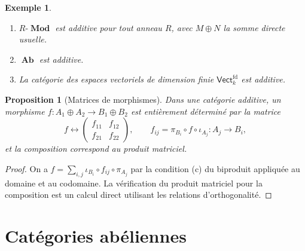 \documentclass[a4paper,12pt]{book}
\DeclareMathOperator{\Ab}{\mathbf{Ab}}
\DeclareMathOperator{\Mod}{\mathbf{Mod}}
\newtheorem{proposition}[theoreme]{Proposition}
\newtheorem{exemple}[theoreme]{Exemple}
\begin{document}
\begin{exemple}\label{ex:additive-cats}
\begin{enumerate}[label=(\roman*)]
\item $R\text{-}\Mod$ est additive pour tout anneau $R$, avec
  $M \oplus N$ la somme directe usuelle.
\item $\Ab$ est additive.
\item La catégorie des espaces vectoriels de dimension finie
  $\mathsf{Vect}_k^{\mathrm{fd}}$
  est additive.
\end{enumerate}
\end{exemple}

\begin{proposition}[Matrices de morphismes]\label{prop:matrix-morphisms}
Dans une catégorie additive, un morphisme
$f \colon A_1 \oplus A_2 \to B_1 \oplus B_2$ est entièrement déterminé
par la matrice
\[
  f \longleftrightarrow
  \begin{pmatrix} f_{11} & f_{12} \\ f_{21} & f_{22} \end{pmatrix},
  \qquad f_{ij} = \pi_{B_i} \circ f \circ \iota_{A_j}
  \colon A_j \to B_i,
\]
et la composition correspond au produit matriciel.
\end{proposition}

\begin{proof}
On a $f = \sum_{i,j} \iota_{B_i} \circ f_{ij} \circ \pi_{A_j}$
par la condition (c) du biproduit appliquée au domaine et au codomaine.
La vérification du produit matriciel pour la composition est un calcul
direct utilisant les relations d'orthogonalité.
\end{proof}


\section{Catégories abéliennes}\label{sec:abelian}
\end{document}
